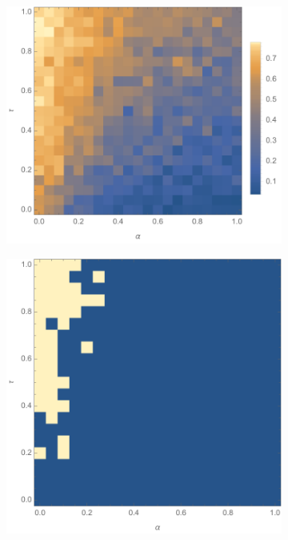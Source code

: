 \documentclass[11pt]{article}
\begin{document}
\begin{figure}[t]
	\centering
	\begin{subfigure}[b]{0.535\textwidth}
    	\includegraphics[trim = 0mm 2mm 0mm 0mm, clip, width=\textwidth]{alpha_tau_static_omega1_beta05_gamma03_expk2_runs50_nocut_notitle.pdf}
        \label{fig:alphatau_static_nocut}
	\end{subfigure}
 	\begin{subfigure}[b]{0.45\textwidth}
    	\includegraphics[width=\textwidth]{alpha_tau_static_omega1_beta05_gamma03_expk2_runs50_cut05_notitle.pdf}

\end{subfigure}
\end{figure}
\end{document}
